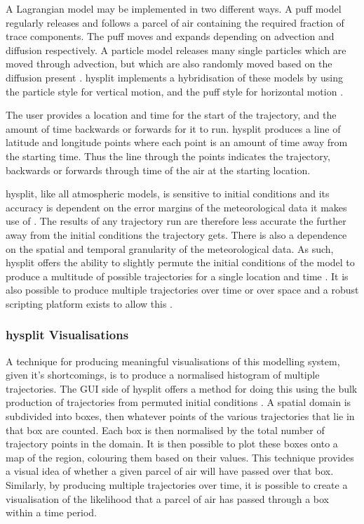	A Lagrangian model may be implemented in two different ways. A puff model regularly releases and follows a parcel of air containing the required fraction of trace components. The puff moves and expands depending on advection and diffusion respectively. A particle model releases many single particles which are moved through advection, but which are also randomly moved based on the diffusion present \citep{draxler:1997tga}. \gls{hysplit} implements a hybridisation of these models by using the particle style for vertical motion, and the puff style for horizontal motion \citep{hurley:1994df}.

	The user provides a location and time for the start of the trajectory, and the amount of time backwards or forwards for it to run. \gls{hysplit} produces a line of latitude and longitude points where each point is an amount of time away from the starting time. Thus the line through the points indicates the trajectory, backwards or forwards through time of the air at the starting location.

	\gls{hysplit}, like all atmospheric models, is sensitive to initial conditions \citep{challa2008sensitivity} and its accuracy is dependent on the error margins of the meteorological data it makes use of \citep{draxler:1998vr}. The results of any trajectory run are therefore less accurate the further away from the initial conditions the trajectory gets. There is also a dependence on the spatial and temporal granularity of the meteorological data. As such, \gls{hysplit} offers the ability to slightly permute the initial conditions of the model to produce a multitude of possible trajectories for a single location and time \citep{draxler:1997tga}. It is also possible to produce multiple trajectories over time or over space and a robust scripting platform exists to allow this \citep{draxler:1997tga}.

	\subsubsection{\gls{hysplit} Visualisations}
	\label{subsubsec:hysvis}

	A technique for producing meaningful visualisations of this modelling system, given it's shortcomings, is to produce a normalised histogram of multiple trajectories. The GUI side of \gls{hysplit} offers a method for doing this using the bulk production of trajectories from permuted initial conditions \citep{draxler:1997tga}.  A spatial domain is subdivided into boxes, then whatever points of the various trajectories that lie in that box are counted. Each box is then normalised by the total number of trajectory points in the domain. It is then possible to plot these boxes onto a map of the region, colouring them based on their values. This technique provides a visual idea of whether a given parcel of air will have passed over that box. Similarly, by producing multiple trajectories over time, it is possible to create a visualisation of the likelihood that a parcel of air has passed through a box within a time period.
	
